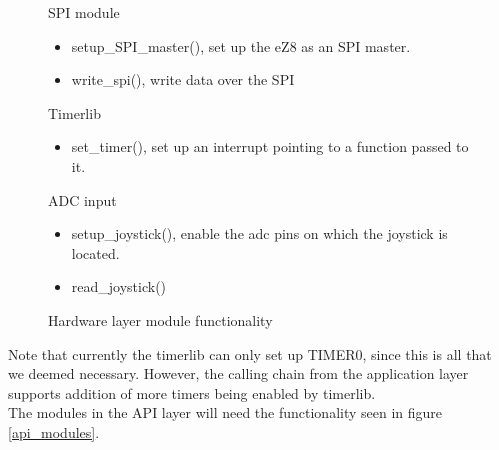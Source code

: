 \begin{figure}
	\center
	\begin{minipage}[t]{0.3\linewidth}
		SPI module
		\begin{itemize}
			\item setup\_SPI\_master(), set up the eZ8 as an SPI master.
			\item write\_spi(), write data over the SPI
		\end{itemize}
	\end{minipage}
	\begin{minipage}[t]{0.3\linewidth}
		Timerlib
		\begin{itemize}
			\item set\_timer(), set up an interrupt pointing to a function passed to it.
		\end{itemize}
	\end{minipage}
	\begin{minipage}[t]{0.3\linewidth}
		ADC input
		\begin{itemize}
			\item setup\_joystick(), enable the adc pins on which the joystick is located.
			\item read\_joystick()
		\end{itemize}
	\end{minipage}
	\caption{Hardware layer module functionality}
	\label{hw_modules}
\end{figure}

Note that currently the timerlib can only set up TIMER0, since this is all that we deemed necessary. However, the calling
chain from the application layer supports addition of more timers being enabled by timerlib. \\

The modules in the API layer will need the functionality seen in figure \ref{api_modules}. 

